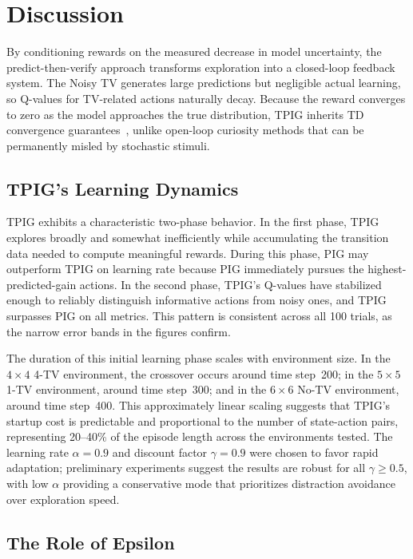\documentclass[letterpaper]{article}
\begin{document}
\section{Discussion}

By conditioning rewards on the measured decrease in model uncertainty,
the predict-then-verify approach transforms exploration into a
closed-loop feedback system.  The Noisy TV generates large predictions
but negligible actual learning, so Q-values for TV-related actions
naturally decay.  Because the reward converges to zero as the model
approaches the true distribution, TPIG inherits TD convergence
guarantees~\cite{Sutton1998}, unlike open-loop curiosity methods that
can be permanently misled by stochastic stimuli.

\subsection{TPIG's Learning Dynamics}

TPIG exhibits a characteristic two-phase behavior.  In the first
phase, TPIG explores broadly and somewhat inefficiently while
accumulating the transition data needed to compute meaningful rewards.
During this phase, PIG may outperform TPIG on learning rate because
PIG immediately pursues the highest-predicted-gain actions.  In the
second phase, TPIG's Q-values have stabilized enough to reliably
distinguish informative actions from noisy ones, and TPIG surpasses
PIG on all metrics.  This pattern is consistent across all 100 trials,
as the narrow error bands in the figures confirm.

The duration of this initial learning phase scales with environment
size.  In the $4 \times 4$ 4-TV environment, the crossover occurs
around time step~200; in the $5 \times 5$ 1-TV environment, around
time step~300; and in the $6 \times 6$ No-TV environment, around time
step~400.  This approximately linear scaling suggests that TPIG's startup cost
is predictable and proportional to the number of state-action pairs,
representing 20--40\% of the episode length across the environments
tested.
The learning rate $\alpha = 0.9$ and
discount factor $\gamma = 0.9$ were chosen to favor rapid adaptation;
preliminary experiments suggest the results are robust for all
$\gamma \geq 0.5$, with low $\alpha$ providing a conservative mode
that prioritizes distraction avoidance over exploration speed.

\subsection{The Role of Epsilon}
\end{document}
